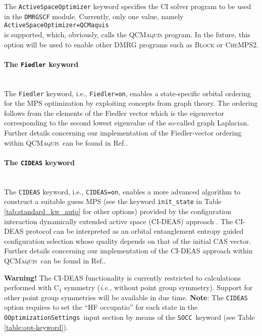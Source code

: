 \documentclass[bibliography=totoc,12pt,a4paper]{scrartcl}
\newcommand{\qcm}{\textsc{QCMaquis}}
\newcommand{\kwd}[1]{\texttt{#1}}
\begin{document}
The \kwd{ActiveSpaceOptimizer} keyword specifies the CI solver program to be used in the \kwd{DMRGSCF} module.
Currently, only one value, namely\\
\noindent\kwd{ActiveSpaceOptimizer=QCMaquis}\\
is supported, which, obviously, calls the \qcm{} program.
In the future, this option will be used to enable other DMRG programs such as \textsc{Block} or \textsc{CheMPS2}.

\paragraph{The \kwd{Fiedler} keyword}\mbox{}\\

The \kwd{Fiedler} keyword, i.e., \noindent\kwd{Fiedler=on}, enables a state-specific orbital ordering for the MPS optimization by exploiting concepts from graph theory. 
The ordering follows from the elements of the Fiedler vector \cite{fied73,fied75} which is the eigenvector corresponding to the second lowest eigenvalue of the so-called graph Laplacian.
Further details concerning our implementation of the Fiedler-vector ordering within \qcm\ can be found in Ref.\cite{interface}.

\paragraph{The \kwd{CIDEAS} keyword}\mbox{}\\

The \kwd{CIDEAS} keyword, i.e., \noindent\kwd{CIDEAS=on}, enables a more advanced algorithm to construct a suitable guess MPS (see the keyword \kwd{init\_state} in Table \ref{tab:standard_kw_auto} for other options) provided by the configuration interaction dynamically extended active space (CI-DEAS) approach \cite{Legeza2003,fiedler}.
The CI-DEAS protocol can be interpreted as an orbital entanglement entropy guided configuration selection whose quality depends on that of the initial CAS vector.
Further details concerning our implementation of the CI-DEAS approach within \qcm\ can be found in Ref.\cite{interface}.

\begin{framed}
  \noindent \textbf{Warning!} The CI-DEAS functionality is currently restricted to calculations performed with C$_1$ symmetry (\textit{i.e.}, without point group symmetry).
  Support for other point group symmetries will be available in due time.
  \noindent \textbf{Note}: The \kwd{CIDEAS} option requires to set the ``HF occupatio'' for each state in the \texttt{OOptimizationSettings}\ input section by means of the \kwd{SOCC}\ keyword (see Table \ref{table:opt-keyword}).
\end{framed}
\end{document}
